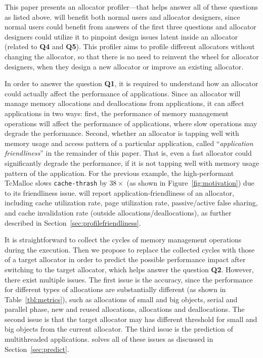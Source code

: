 This paper presents an allocator profiler--\MP{}--that helps answer all of these questions as listed above. \MP{} will benefit both normal users and allocator designers, since normal users could benefit from answers of the first three questions and allocator designers could utilize it to pinpoint design issues latent inside an allocator (related to \textbf{Q4} and \textbf{Q5}). This profiler  aims to profile different allocators without changing the allocator, so that there is no need to reinvent the wheel for allocator designers, when they design a new allocator or improve an existing allocator. 

In order to answer the question \textbf{Q1}, it is required to understand how an allocator could actually affect the performance of applications. Since an allocator will manage memory allocations and deallocations from applications, it can affect applications in two ways: first, the performance of memory management operations will affect the performance of applications, where slow operations may degrade the performance.  Second, whether an allocator is tapping well with memory usage and access pattern of a particular application, called ``\textit{application friendliness}'' in the remainder of this paper. That is, even a fast allocator could significantly degrade the performance, if it is not tapping well with memory usage pattern of the application. For the previous example, the   high-performant TcMalloc slows \texttt{cache-thrash} by $38\times$ (as shown in Figure~\ref{fig:motivation}) due to its friendliness issue. \MP{} will report application-friendliness of an allocator, including cache utilization rate, page utilization rate, passive/active false sharing, and cache invalidation rate (outside allocations/deallocations), as further described in Section~\ref{sec:profilefriendliness}. 


It is straightforward to collect the cycles of memory management operations during the execution. Then we propose to replace the collected cycles with those of a target allocator in order to predict the possible performance impact after switching to the target allocator, which helps answer the question \textbf{Q2}. However, there exist multiple issues. The first issue is the accuracy, since the performance for different types of allocations are substantially different (as shown in Table~\ref{tbl:metrics}), such as allocations of small and big objects, serial and parallel phase, new and reused allocations, allocations and deallocations. The second issue is that the target allocator may has different threshold for small and big objects from the current allocator. The third issue is the prediction of multithreaded applications. \MP{} solves all of these issues as discussed in Section~\ref{sec:predict}.

